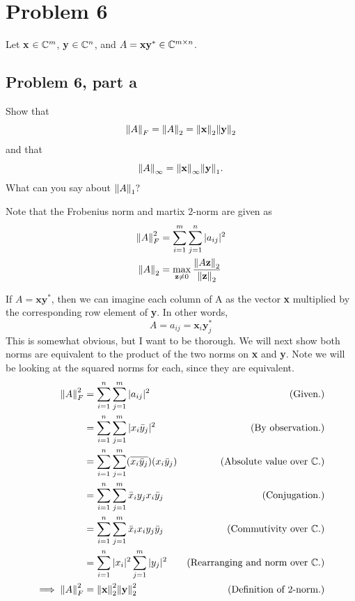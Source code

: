 \newpage
\section{Problem 6}
Let \textbf{x} $\in \mathbb{C}^m$, \textbf{y} $\in \mathbb{C}^n$, and $A = \textbf{x}\textbf{y}^* \in \mathbb{C}^{m\times n}$.

\subsection{Problem 6, part a}
Show that
\[
\norm{A}_F = \norm{A}_2 = \norm{\textbf{x}}_2\norm{\textbf{y}}_2
\]
and that 
\[
\norm{A}_\infty = \norm{\textbf{x}}_\infty \norm{\textbf{y}}_1.
\]
What can you say about $\norm{A}_1?$
\partbreak
\begin{solution}

    Note that the Frobenius norm and martix $2$-norm are given as
    \alignbreak
    \begin{align}
    \norm{A}_F^2 &= \sum_{i = 1}^m\sum_{j = 1}^n|a_{ij}|^2\nonumber\\
    \norm{A}_2 &= \max_{\textbf{z} \neq 0}\frac{\norm{A\textbf{z}}_2}{\norm{\textbf{z}}_2}\nonumber
    \end{align}
    \alignbreak

    If $A = \textbf{x}\textbf{y}^*$, then we can imagine each column of A as the vector \textbf{x} multiplied by the corresponding row element of \textbf{y}. In other words,
    \[
    A = a_{ij} = \textbf{x}_i\textbf{y}_j^*
    \]
    This is somewhat obvious, but I want to be thorough. We will next show both norms are equivalent to the product of the two norms on \textbf{x} and \textbf{y}. Note we will be looking at the squared norms for each, since they are equivalent.
    \newpage
    \alignbreak
    \begin{align}
        \norm{A}_F^2 &= \sum_{i = 1}^{n}\sum_{j = 1}^m |a_{ij}|^2 &\text{(Given.)}\nonumber\\
        &= \sum_{i = 1}^{n}\sum_{j = 1}^m |x_i\Bar{y}_j|^2 &\text{(By observation.)}\nonumber\\
        &= \sum_{i = 1}^{n}\sum_{j = 1}^m (\overline{x_i\Bar{y}_j})(x_i\Bar{y}_j) &\text{(Absolute value over $\mathbb{C}$.)}\nonumber\\
        &= \sum_{i = 1}^{n}\sum_{j = 1}^m \Bar{x}_iy_jx_i\Bar{y}_j &\text{(Conjugation.)}\nonumber\\
        &= \sum_{i = 1}^{n}\sum_{j = 1}^m \Bar{x}_ix_i y_j\Bar{y}_j &\text{(Commutivity over $\mathbb{C}$.)}\nonumber\\
        &= \sum_{i = 1}^{n}|x_i|^2\sum_{j = 1}^m|y_j|^2 &\text{(Rearranging and norm over $\mathbb{C}$.)}\nonumber\\
     \implies   \norm{A}_F^2&= \norm{\textbf{x}}_2^2\norm{\textbf{y}}_2^2 &\text{(Definition of $2$-norm.)}\nonumber
    \end{align}
    \alignbreak


\end{solution}
